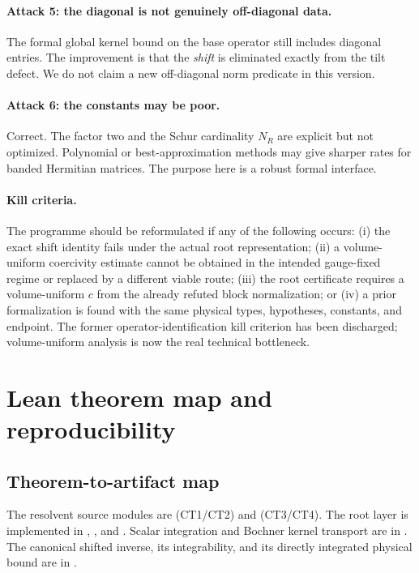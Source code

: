 \documentclass[11pt]{article}
\theoremstyle{definition}
\begin{document}
\paragraph{Attack 5: the diagonal is not genuinely off-diagonal data.}  The
formal global kernel bound on the base operator still includes diagonal
entries.  The improvement is that the \emph{shift} is eliminated exactly from
the tilt defect.  We do not claim a new off-diagonal norm predicate in this
version.

\paragraph{Attack 6: the constants may be poor.}  Correct.  The factor two and
the Schur cardinality $N_R$ are explicit but not optimized.  Polynomial or
best-approximation methods may give sharper rates for banded Hermitian
matrices.  The purpose here is a robust formal interface.

\paragraph{Kill criteria.}  The programme should be reformulated if any of the
following occurs: (i) the exact shift identity fails under the actual root
representation; (ii) a volume-uniform coercivity estimate cannot be obtained
in the intended gauge-fixed regime or replaced by a different viable route;
(iii) the root certificate requires a
volume-uniform $c$ from the already refuted block normalization; or (iv) a
prior formalization is found with the same physical types, hypotheses,
constants, and endpoint.  The former operator-identification kill criterion
has been discharged; volume-uniform analysis is now the real technical
bottleneck.

\section{Lean theorem map and reproducibility}\label{sec:repro}

\subsection{Theorem-to-artifact map}

The resolvent source modules are
 (CT1/CT2) and
 (CT3/CT4).
The root layer is implemented in
,
, and
.  Scalar integration and
Bochner kernel transport are in .  The
canonical shifted inverse, its integrability, and its directly integrated
physical bound are in .
\end{document}
